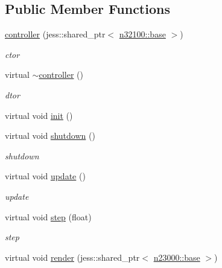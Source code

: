 \subsection*{Public Member Functions}
\begin{DoxyCompactItemize}
\item 
\hyperlink{classnebula_1_1content_1_1actor_1_1admin_1_1controller_a6d419bce4654e2f59db0b561f08ddb59}{controller} (jess::shared\_\-ptr$<$ \hyperlink{classnebula_1_1content_1_1scene_1_1admin_1_1base}{n32100::base} $>$)
\begin{DoxyCompactList}\small\item\em ctor \item\end{DoxyCompactList}\item 
virtual \hyperlink{classnebula_1_1content_1_1actor_1_1admin_1_1controller_a3f63b0d700a01c43e3ff171321a3d630}{$\sim$controller} ()
\begin{DoxyCompactList}\small\item\em dtor \item\end{DoxyCompactList}\item 
virtual void \hyperlink{classnebula_1_1content_1_1actor_1_1admin_1_1controller_aaabeb54ec0f83d9b836562384a9a1f4d}{init} ()
\item 
virtual void \hyperlink{classnebula_1_1content_1_1actor_1_1admin_1_1controller_a745fba99f1dab2a7bdc5f5c54d14a8e2}{shutdown} ()
\begin{DoxyCompactList}\small\item\em shutdown \item\end{DoxyCompactList}\item 
virtual void \hyperlink{classnebula_1_1content_1_1actor_1_1admin_1_1controller_ac86d7c729afb23839db48bde2e52dcc6}{update} ()
\begin{DoxyCompactList}\small\item\em update \item\end{DoxyCompactList}\item 
virtual void \hyperlink{classnebula_1_1content_1_1actor_1_1admin_1_1controller_a0cac5286fe3874391eea6dabae7ce06a}{step} (float)
\begin{DoxyCompactList}\small\item\em step \item\end{DoxyCompactList}\item 
virtual void \hyperlink{classnebula_1_1content_1_1actor_1_1admin_1_1controller_a0562e7a0508449775304548831563275}{render} (jess::shared\_\-ptr$<$ \hyperlink{classnebula_1_1platform_1_1renderer_1_1base}{n23000::base} $>$)

\end{DoxyCompactItemize}
